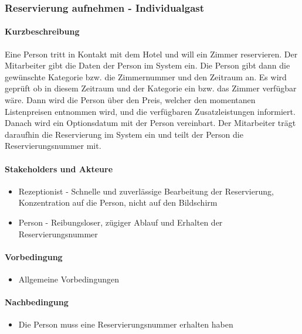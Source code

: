 \subsubsection{Reservierung aufnehmen - Individualgast}

\paragraph{Kurzbeschreibung}
Eine Person tritt in Kontakt mit dem Hotel und will ein \Gls{Zimmer} reservieren. Der \Gls{Mitarbeiter} gibt die Daten der Person im System ein. Die Person gibt dann die gewünschte Kategorie bzw. die \Gls{Zimmernummer} und den Zeitraum an. Es wird geprüft ob in diesem Zeitraum und der Kategorie ein bzw. das \Gls{Zimmer} verfügbar wäre. Dann wird die Person über den Preis, welcher den momentanen Listenpreisen entnommen wird, und die verfügbaren \Gls{Zusatzleistung}en informiert. Danach wird ein \Gls{Optionsdatum} mit der Person vereinbart. Der \Gls{Mitarbeiter} trägt daraufhin die \Gls{Reservierung} im System ein und teilt der Person die \Gls{Reservierungsnummer} mit.

\paragraph{Stakeholders und Akteure}
\begin{itemize}
	\item \Gls{Rezeptionist} - Schnelle und zuverlässige Bearbeitung der
	\Gls{Reservierung}, Konzentration auf die Person, nicht auf den Bildschirm
	\item Person - Reibungsloser, zügiger Ablauf und Erhalten der \Gls{Reservierungsnummer}
\end{itemize}

\paragraph{Vorbedingung}
\begin{itemize}
	\item Allgemeine Vorbedingungen
\end{itemize}

\paragraph{Nachbedingung}
\begin{itemize}
	\item Die Person muss eine Reservierungsnummer erhalten haben
\end{itemize}

